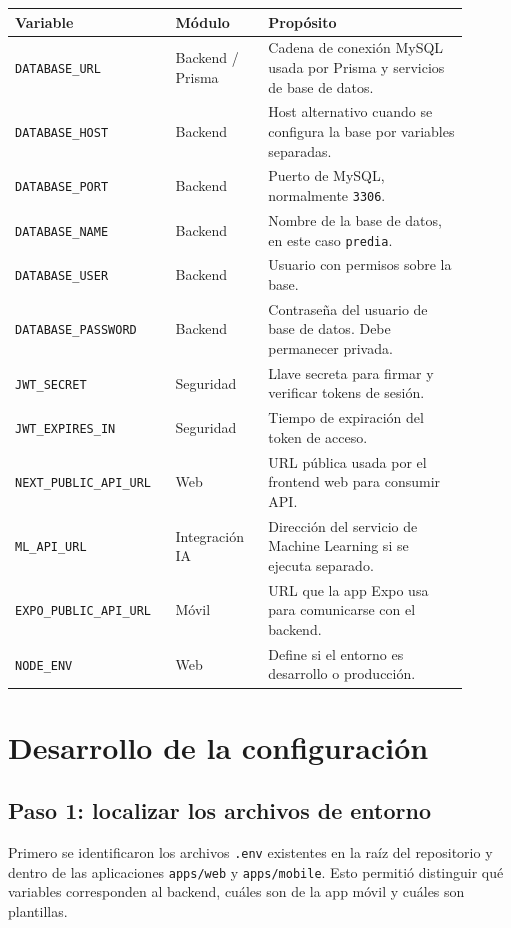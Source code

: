 \documentclass[12pt,a4paper]{article}
\begin{document}
\begin{longtable}{p{0.30\linewidth}p{0.19\linewidth}p{0.41\linewidth}}
\toprule
\textbf{Variable} & \textbf{Módulo} & \textbf{Propósito} \\
\midrule
\texttt{DATABASE\_URL} & Backend / Prisma & Cadena de conexión MySQL usada por Prisma y servicios de base de datos. \\
\texttt{DATABASE\_HOST} & Backend & Host alternativo cuando se configura la base por variables separadas. \\
\texttt{DATABASE\_PORT} & Backend & Puerto de MySQL, normalmente \texttt{3306}. \\
\texttt{DATABASE\_NAME} & Backend & Nombre de la base de datos, en este caso \texttt{predia}. \\
\texttt{DATABASE\_USER} & Backend & Usuario con permisos sobre la base. \\
\texttt{DATABASE\_PASSWORD} & Backend & Contraseña del usuario de base de datos. Debe permanecer privada. \\
\texttt{JWT\_SECRET} & Seguridad & Llave secreta para firmar y verificar tokens de sesión. \\
\texttt{JWT\_EXPIRES\_IN} & Seguridad & Tiempo de expiración del token de acceso. \\
\texttt{NEXT\_PUBLIC\_API\_URL} & Web & URL pública usada por el frontend web para consumir API. \\
\texttt{ML\_API\_URL} & Integración IA & Dirección del servicio de Machine Learning si se ejecuta separado. \\
\texttt{EXPO\_PUBLIC\_API\_URL} & Móvil & URL que la app Expo usa para comunicarse con el backend. \\
\texttt{NODE\_ENV} & Web & Define si el entorno es desarrollo o producción. \\
\bottomrule
\end{longtable}

\section{Desarrollo de la configuración}

\subsection{Paso 1: localizar los archivos de entorno}

Primero se identificaron los archivos \texttt{.env} existentes en la raíz del repositorio y dentro de las aplicaciones \texttt{apps/web} y \texttt{apps/mobile}. Esto permitió distinguir qué variables corresponden al backend, cuáles son de la app móvil y cuáles son plantillas.
\end{document}
